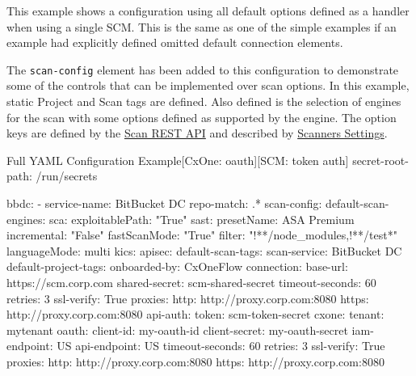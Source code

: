 This example shows a \cxoneflow configuration using all default options defined
as a handler when using a single SCM.  This is the same as one of the simple examples if
an example had explicitly defined omitted default connection elements.

The \texttt{scan-config} element has been added to this configuration to
demonstrate some of the controls that can be implemented over scan options.  In this
example, static Project and Scan tags are defined.  Also defined is the selection
of engines for the scan with some options defined as supported by the engine.  The
option keys are defined by the
\href{https://checkmarx.stoplight.io/docs/checkmarx-one-api-reference-guide/branches/main/f601dd9456e80-run-a-scan}{Scan REST API}
and described by
\href{https://checkmarx.com/resource/documents/en/34965-68598-global-settings.html#UUID-8e38f06b-45d4-ea7f-5ff5-50deb22e43aa_UUID-1a4211ec-dbf9-a180-cb20-59e1246ec3fb}{Scanners Settings}.


\begin{code}{Full YAML Configuration Example}{[CxOne: oauth]}{[SCM: token auth]}
secret-root-path: /run/secrets

bbdc:
    - service-name: BitBucket DC
      repo-match: .*
      scan-config:
          default-scan-engines:
              sca:
                  exploitablePath: "True"
              sast:
                  presetName: ASA Premium
                  incremental: "False"
                  fastScanMode: "True"
                  filter: "!**/node_modules,!**/test*"
                  languageMode: multi
              kics:
              apisec:
          default-scan-tags:
              scan-service: BitBucket DC
          default-project-tags:
              onboarded-by: CxOneFlow
      connection:
          base-url: https://scm.corp.com
          shared-secret: scm-shared-secret
          timeout-seconds: 60
          retries: 3
          ssl-verify: True
          proxies:
            http: http://proxy.corp.com:8080
            https: http://proxy.corp.com:8080
          api-auth:
              token: scm-token-secret
      cxone:
          tenant: mytenant
          oauth:
              client-id: my-oauth-id
              client-secret: my-oauth-secret
          iam-endpoint: US
          api-endpoint: US
          timeout-seconds: 60
          retries: 3
          ssl-verify: True
          proxies:
            http: http://proxy.corp.com:8080
            https: http://proxy.corp.com:8080
\end{code}


